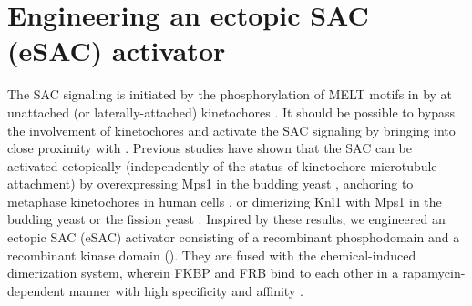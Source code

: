 \section{Engineering an ectopic SAC (eSAC) activator}
The SAC signaling is initiated by the phosphorylation of MELT motifs in  by  at unattached (or laterally-attached) kinetochores \cite{MPS1-KNL1_London2012, MPS1-KNL1_Shepperd2012, MPS1-KNL1_Yamagishi2012, GSK923295MonastrolCotreatment, GSK923295LateralAttachmentEM, LateralAttachmentSAC}. It should be possible to bypass the involvement of kinetochores and activate the SAC signaling by bringing  into close proximity with . Previous studies have shown that the SAC can be activated ectopically (independently of the status of kinetochore-microtubule attachment) by overexpressing Mps1 in the budding yeast \cite{Mps1pOverexpressionActivatesSAC}, anchoring  to metaphase kinetochores in human cells \cite{HeLa-A12_Ballister2014}, or dimerizing Knl1 with Mps1 in the budding yeast \cite{BuddingYeasteSAC} or the fission yeast \cite{FissionYeasteSAC}. Inspired by these results, we engineered an ectopic SAC (eSAC) activator consisting of a recombinant  phosphodomain and a recombinant  kinase domain (). They are fused with the chemical-induced dimerization system, wherein FKBP and FRB bind to each other in a rapamycin-dependent manner with high specificity and affinity \cite{FKBP-Rapamycin-FRB}.

